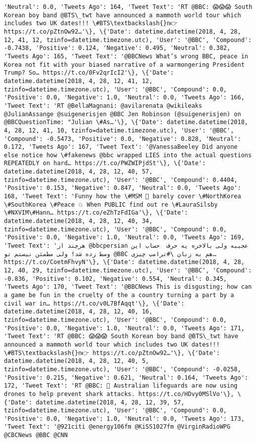 \documentclass[11pt]{article}
\begin{document}
\begin{Verbatim}[commandchars=\\\{\}]
'Neutral': 0.0, 'Tweets Ago': 164, 'Tweet Text': 'RT @BBC: 😱😱😱 South Korean boy band @BTS\_twt have announced a mammoth world tour which includes two UK dates!!! \#BTS\textbackslash{}n👉 https://t.co/pZtnOw92…'\}, \{'Date': datetime.datetime(2018, 4, 28, 12, 41, 12, tzinfo=datetime.timezone.utc), 'User': '@BBC', 'Compound': -0.7438, 'Positive': 0.124, 'Negative': 0.495, 'Neutral': 0.382, 'Tweets Ago': 165, 'Tweet Text': '@BBCNews What’s wrong BBC, peace in Korea not fit with your biased narrative of a warmongering President Trump? So… https://t.co/0Fv2qrIcI2'\}, \{'Date': datetime.datetime(2018, 4, 28, 12, 41, 12, tzinfo=datetime.timezone.utc), 'User': '@BBC', 'Compound': 0.0, 'Positive': 0.0, 'Negative': 1.0, 'Neutral': 0.0, 'Tweets Ago': 166, 'Tweet Text': 'RT @BellaMagnani: @avilarenata @wikileaks @JulianAssange @suigenerisjen @BBC Jen Robinson (@suigenerisjen) on @BBCQuestionTime: "Julian \#As…'\}, \{'Date': datetime.datetime(2018, 4, 28, 12, 41, 10, tzinfo=datetime.timezone.utc), 'User': '@BBC', 'Compound': -0.5473, 'Positive': 0.0, 'Negative': 0.828, 'Neutral': 0.172, 'Tweets Ago': 167, 'Tweet Text': '@VanessaBeeley Did anyone else notice how \#fakenews @bbc wrapped LIES into the actual questions REPEATEDLY on hard… https://t.co/PWZWIPjdSt'\}, \{'Date': datetime.datetime(2018, 4, 28, 12, 40, 57, tzinfo=datetime.timezone.utc), 'User': '@BBC', 'Compound': 0.4404, 'Positive': 0.153, 'Negative': 0.847, 'Neutral': 0.0, 'Tweets Ago': 168, 'Tweet Text': 'Funny how the \#MSM 💩 barely cover \#NorthKorea \#SouthKorea \#Peace 💥 When PUBLIC find out re \#LauraSilsby \#NXVIM\#Hann… https://t.co/eZhTzFdIGa'\}, \{'Date': datetime.datetime(2018, 4, 28, 12, 40, 34, tzinfo=datetime.timezone.utc), 'User': '@BBC', 'Compound': 0.0, 'Positive': 0.0, 'Negative': 1.0, 'Neutral': 0.0, 'Tweets Ago': 169, 'Tweet Text': 'هرچند از @bbcpersian عجیبه ولی بالاخره یه حرف  حساب این وسط زده شد! ولی مطمئن نیستم تو @BBC هم به زبان \#ترامپ چیزی… https://t.co/CoetmFhvyN'\}, \{'Date': datetime.datetime(2018, 4, 28, 12, 40, 29, tzinfo=datetime.timezone.utc), 'User': '@BBC', 'Compound': -0.836, 'Positive': 0.102, 'Negative': 0.554, 'Neutral': 0.345, 'Tweets Ago': 170, 'Tweet Text': '@BBCNews This is disgusting; how can a game be fun in the cruelty of the a country turning a part by a civil war in… https://t.co/v0L7BfAqqt'\}, \{'Date': datetime.datetime(2018, 4, 28, 12, 40, 16, tzinfo=datetime.timezone.utc), 'User': '@BBC', 'Compound': 0.0, 'Positive': 0.0, 'Negative': 1.0, 'Neutral': 0.0, 'Tweets Ago': 171, 'Tweet Text': 'RT @BBC: 😱😱😱 South Korean boy band @BTS\_twt have announced a mammoth world tour which includes two UK dates!!! \#BTS\textbackslash{}n👉 https://t.co/pZtnOw92…'\}, \{'Date': datetime.datetime(2018, 4, 28, 12, 40, 5, tzinfo=datetime.timezone.utc), 'User': '@BBC', 'Compound': -0.0258, 'Positive': 0.215, 'Negative': 0.621, 'Neutral': 0.164, 'Tweets Ago': 172, 'Tweet Text': 'RT @BBC: 🦈 Australian lifeguards are now using drones to help prevent shark attacks. https://t.co/HDvy0MSlVo'\}, \{'Date': datetime.datetime(2018, 4, 28, 12, 39, 57, tzinfo=datetime.timezone.utc), 'User': '@BBC', 'Compound': 0.0, 'Positive': 0.0, 'Negative': 1.0, 'Neutral': 0.0, 'Tweets Ago': 173, 'Tweet Text': '@921citi @energy106fm @KiSS1027fm @VirginRadioWPG @CBCNews @BBC @CNN 
\end{Verbatim}
\end{document}
